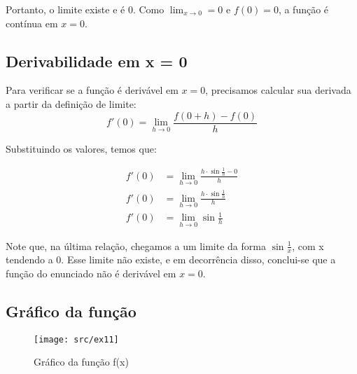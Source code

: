 Portanto, o limite existe e é 0. Como $\lim_{x\to0} = 0$ e $f(0) = 0$, a função é contínua em $x = 0$.



\subsection{Derivabilidade em x = 0}

Para verificar se a função é derivável em $x = 0$, precisamos calcular sua derivada a partir da definição
de limite:
\[f'(0) = \lim_{h\to0} \frac{f(0 + h) - f(0)}{h}\]

Substituindo os valores, temos que:

\begin{align*}
    f'(0) &= \lim_{h\to0} \frac{h\cdot\sin{\frac{1}{h}} - 0}{h} \\
    f'(0) &= \lim_{h\to0} \frac{h\cdot\sin{\frac{1}{h}}}{h} \\
    f'(0) &= \lim_{h\to0} \sin{\frac{1}{h}}
\end{align*}

Note que, na última relação, chegamos a um limite da forma $\sin{\frac{1}{x}}$, com x tendendo a 0.
Esse limite não existe, e em decorrência disso, conclui-se que a função do enunciado não é derivável em
 $x = 0$.


 \subsection{Gráfico da função}

 \begin{figure}[H]
    \centering
    \texttt{[image: src/ex11]}
    \caption{Gráfico da função f(x)}
 \end{figure}

